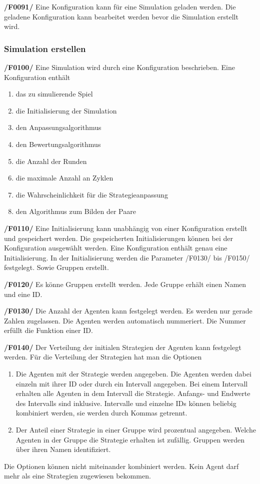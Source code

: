 \textbf{/F0091/}
Eine Konfiguration kann für eine Simulation geladen werden. Die geladene Konfiguration kann bearbeitet werden bevor die Simulation erstellt wird.

\subsubsection{Simulation erstellen}

\textbf{/F0100/}
Eine Simulation wird durch eine Konfiguration beschrieben. Eine Konfiguration enthält
\begin{enumerate}
\item das zu simulierende Spiel
\item die Initialisierung der Simulation
\item den Anpassungsalgorithmus 
\item den Bewertungsalgorithmus
\item die Anzahl der Runden
\item die maximale Anzahl an Zyklen
\item die Wahrscheinlichkeit für die Strategieanpassung
\item den Algorithmus zum Bilden der Paare
\end{enumerate}

\textbf{/F0110/}
Eine Initialisierung kann unabhängig von einer Konfiguration erstellt und gespeichert werden. Die gespeicherten Initialisierungen können bei der Konfiguration ausgewählt werden. Eine Konfiguration enthält genau eine Initialisierung. In der Initialisierung werden die Parameter /F0130/ bis /F0150/ festgelegt. Sowie Gruppen erstellt.

\textbf{/F0120/}
Es könne Gruppen erstellt werden. Jede Gruppe erhält einen Namen und eine ID. 

\textbf{/F0130/} 
Die Anzahl der Agenten kann festgelegt werden. Es werden nur gerade Zahlen zugelassen. Die Agenten werden automatisch nummeriert. Die Nummer erfüllt die Funktion einer ID.

\textbf{/F0140/} 
Der Verteilung der initialen Strategien der Agenten kann festgelegt werden. Für die Verteilung der Strategien hat man die Optionen
\begin{enumerate}
\item Die Agenten mit der Strategie werden angegeben. Die Agenten werden dabei einzeln mit ihrer ID oder durch ein Intervall angegeben. Bei einem Intervall erhalten alle Agenten in dem Intervall die Strategie. Anfangs- und Endwerte des Intervalls sind inklusive. Intervalle und einzelne IDs können beliebig kombiniert werden, sie werden durch Kommas getrennt.
\item Der Anteil einer Strategie in einer Gruppe wird prozentual angegeben. Welche Agenten in der Gruppe die Strategie erhalten ist zufällig. Gruppen werden über ihren Namen identifiziert. 
\end{enumerate}
{\color{red}Die Optionen können nicht miteinander kombiniert werden.} Kein Agent darf mehr als eine Strategien zugewiesen bekommen.

